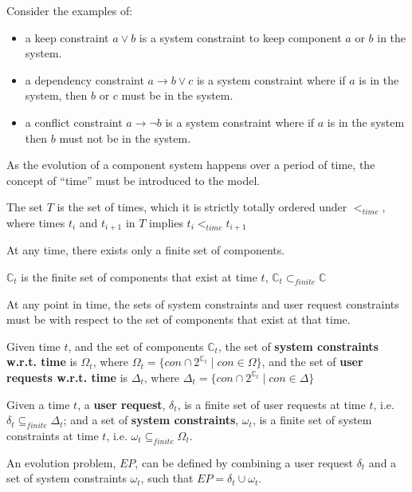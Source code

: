 Consider the examples of:
\begin{itemize}
  \item a keep constraint $a \vee b$ is a system constraint to keep component $a$ or $b$ in the system.
  \item a dependency constraint $a \rightarrow b \vee c$ is a system constraint where if $a$ is in the system, then $b$ or $c$ must be in the system.
  \item a conflict constraint $a \rightarrow \neg b$ is a system constraint where if $a$ is in the system then $b$ must not be in the system.
\end{itemize} 

As the evolution of a component system happens over a period of time, the concept of ``time'' must be introduced to the model.
\begin{defs}
The set $T$ is the set of times, which it is strictly totally ordered under $<_{time}$, where times $t_i$ and $t_{i+1}$ in $T$ implies $t_i <_{time} t_{i+1}$
\end{defs}

At any time, there exists only a finite set of components. 
\begin{defs}
$\mathbb{C}_{t}$ is the finite set of components that exist at time $t$, $\mathbb{C}_{t} \subset_{finite} \mathbb{C}$
\end{defs}

At any point in time, the sets of system constraints and user request constraints must be with respect to the set of components that exist at that time.
\begin{defs}
Given time $t$, and the set of components $\mathbb{C}_{t}$, the set of \textbf{system constraints w.r.t. time} is $\Omega_{t}$, where $\Omega_{t} = \{con \cap 2^{\mathbb{C}_{t}} \mid con \in \Omega\}$,
and the set of \textbf{user requests w.r.t. time} is $\Delta_{t}$, where $\Delta_{t} = \{con \cap 2^{\mathbb{C}_{t}} \mid con \in \Delta\}$
\end{defs}

\begin{defs}
Given a time $t$, a \textbf{user request}, $\delta_{t}$, is a finite set of user requests at time $t$, i.e. $\delta_{t} \subseteq_{finite} \Delta_{t}$;
and a set of \textbf{system constraints}, $\omega_{t}$, is a finite set of system constraints at time $t$, i.e. $\omega_{t} \subseteq_{finite} \Omega_{t}$.  
\end{defs}

An evolution problem, $EP$, can be defined by combining a user request $\delta_{t}$ and a set of system constraints $\omega_{t}$, such that $EP = \delta_{t} \cup \omega_{t}$.

